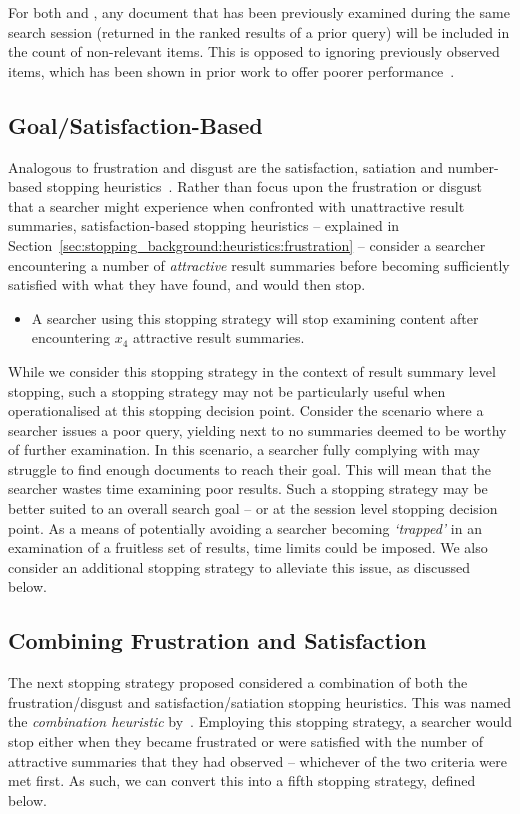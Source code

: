 For both  and , any document that has been previously examined during the same search session (returned in the ranked results of a prior query) will be included in the count of non-relevant items. This is opposed to ignoring previously observed items, which has been shown in prior work to offer poorer performance~\citep{maxwell2015stopping_strategies}.

\subsection{Goal/Satisfaction-Based}
Analogous to frustration and disgust are the satisfaction, satiation and number-based stopping heuristics~\citep{cooper1973retrieval_effectiveness_ii, simon1955satiation, gibb1958number_rule}. Rather than focus upon the frustration or disgust that a searcher might experience when confronted with unattractive result summaries, satisfaction-based stopping heuristics -- explained in Section~\ref{sec:stopping_background:heuristics:frustration} -- consider a searcher encountering a number of \emph{attractive} result summaries before becoming sufficiently satisfied with what they have found, and would then stop.

\begin{itemize}
    \item{ A searcher using this stopping strategy will stop examining content after encountering $x_4$ attractive result summaries.}
\end{itemize}

While we consider this stopping strategy in the context of result summary level stopping, such a stopping strategy may not be particularly useful when operationalised at this stopping decision point. Consider the scenario where a searcher issues a poor query, yielding next to no summaries deemed to be worthy of further examination. In this scenario, a searcher fully complying with  may struggle to find enough documents to reach their goal. This will mean that the searcher wastes time examining poor results. Such a stopping strategy may be better suited to an overall search goal -- or at the session level stopping decision point. As a means of potentially avoiding a searcher becoming \emph{`trapped'} in an examination of a fruitless set of results, time limits could be imposed. We also consider an additional stopping strategy to alleviate this issue, as discussed below.

\subsection{Combining Frustration and Satisfaction}
The next stopping strategy proposed considered a combination of both the frustration/disgust and satisfaction/satiation stopping heuristics. This was named the \emph{combination heuristic} by~\cite{kraft1979stopping_rules}. Employing this stopping strategy, a searcher would stop either when they became frustrated or were satisfied with the number of attractive summaries that they had observed -- whichever of the two criteria were met first. As such, we can convert this into a fifth stopping strategy, defined below.


